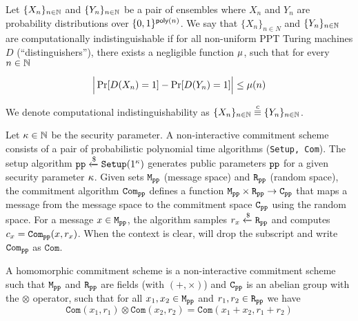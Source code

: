 \begin{definition}
  \label{defn:indisitinguish} Let $\{ X_n\}_{n \in \mathbb{N} }$ and $\{ Y_n\}_{n \in \mathbb{N} }$ be a pair of ensembles where $X_n$ and $Y_n$ are probability distributions over $\{ 0, 1\}^{\mathsf{poly}(n)}$. 
We say that $\{ X_n\}_{n \in N }$ and $\{ Y_n\}_{n \in \mathbb{N} }$
  are computationally indistinguishable if for all non-uniform PPT Turing machines $D$ (``distinguishers''), there exists a negligible function $\mu$, such that for every $n \in \mathbb{N}$

\begin{equation*}
    \Big| \Pr[D(X_n) = 1] - \Pr[D(Y_n) = 1] \Big| \leq \mu(n) 
\end{equation*}
  
We denote computational indistinguishability as $\{ X_n\}_{n \in \mathbb{N}} \stackrel{c}{\equiv} \{
  Y_n\}_{n \in \mathbb{N}}$.
   
\end{definition}


\begin{definition} \label{def:commitments}Let $\kappa \in \mathbb{N}$ be the security
  parameter. 
  A non-interactive commitment scheme consists of a pair of
  probabilistic polynomial time algorithms (\texttt{Setup, Com}). 
  The setup algorithm $\texttt{pp} \xleftarrow{\$} \texttt{Setup}(1^\kappa)$ generates
  public parameters $\texttt{pp}$ for a given security parameter $\kappa$. 
  Given sets $\texttt{M}_{\texttt{pp}}$ (message space) and $\texttt{R}_{\texttt{pp}}$ (random space), the commitment algorithm
  $\texttt{Com}_{\texttt{pp}}$ defines a function
  $\texttt{M}_{\texttt{pp}} \times \texttt{R}_{\texttt{pp}} \rightarrow
  \texttt{C}_{\texttt{pp}}$ that maps a message from the message space to the commitment space
  $\texttt{C}_{\texttt{pp}}$ using the random space. For a message
  $x \in \texttt{M}_{\texttt{pp}}$, the algorithm samples
  $r_x \xleftarrow{\$} \texttt{R}_{\texttt{pp}}$ and computes
  $c_x = \texttt{Com}_{\texttt{pp}}(x, r_x)$. When the context is clear, will
  drop the subscript and write $\texttt{Com}_{\texttt{pp}} $ as $\texttt{Com}$.
\end{definition}

\begin{definition}
\label{defn:hom_coms}
A homomorphic commitment scheme is a non-interactive commitment scheme
such that $\texttt{M}_{\texttt{pp}}$ and $ \texttt{R}_{\texttt{pp}}$ are fields (with
$(+, \times)$) and $\texttt{C}_{\texttt{pp}}$ is an abelian group with the
$\otimes$ operator, such
that for all $x_1, x_2 \in \texttt{M}_{\texttt{pp}}$ and
$r_1, r_2 \in \texttt{R}_{\texttt{pp}}$ we have
%
\begin{equation}
\label{eq:hom_coms}
\texttt{Com}(x_1, r_1) \otimes \texttt{Com}(x_2, r_2) = \texttt{Com}(x_1 + x_2, r_1 + r_2)
\end{equation}
\end{definition}


